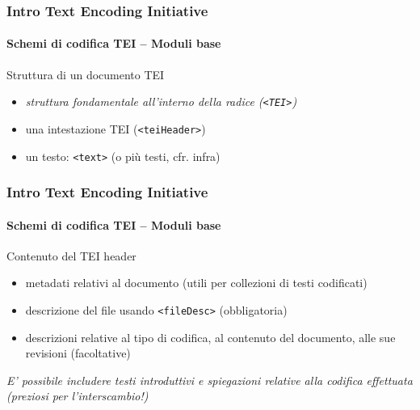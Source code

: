 \begin{frame}
	\frametitle{Intro Text Encoding Initiative}
	\framesubtitle{Schemi di codifica TEI – Moduli base}
	\addtocounter{nframe}{1}

	\begin{block}{Struttura di un documento TEI}
        \begin{itemize}
            \item \textit{struttura fondamentale all’interno della radice (\texttt{<TEI>})}
            \item una intestazione TEI (\texttt{<teiHeader>})
            \item un testo: \texttt{<text>} (o più testi, cfr. infra)
        \end{itemize}
    \end{block}
    
\end{frame}


\begin{frame}
	\frametitle{Intro Text Encoding Initiative}
	\framesubtitle{Schemi di codifica TEI – Moduli base}
	\addtocounter{nframe}{1}

    \begin{block}{Contenuto del TEI header}
        \begin{itemize}
            \item metadati relativi al documento (utili per collezioni di testi
            codificati)
            \item descrizione del file usando \texttt{<fileDesc>} (obbligatoria)
            \item descrizioni relative al tipo di codifica, al contenuto del
            documento, alle sue revisioni (facoltative)
        \end{itemize}
    \end{block}
\textit{E' possibile includere testi introduttivi e spiegazioni relative alla
codifica effettuata (preziosi per l’interscambio!)}

\end{frame}






